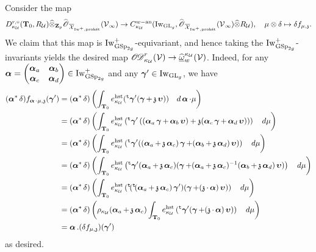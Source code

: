 Consider the map
$$D_{\kappa_{\calU}}^{r, \circ}(\T_0, R_{\calU})\widehat{\otimes}_{\Z_p}\widehat{\scrO}_{\overline{\calX}_{\Iw^+, \proket}}(\calV_{\infty})\rightarrow C^{w-\an}_{\kappa_{\calU}}(\Iw_{\GL_g}, \widehat{\scrO}_{\overline{\calX}_{\Iw^+, \proket}}(\calV_{\infty})\widehat{\otimes}R_{\calU}), \quad \mu\otimes \delta\mapsto \delta f_{\mu, \frakz}.$$
We claim that this map is $\Iw_{\GSp_{2g}}^+$-equivariant, and hence taking the $\Iw_{\GSp_{2g}}^+$-invariants yields the desired map $\sheafOD_{\kappa_{\calU}}^r(\calV)\rightarrow\widehat{\underline{\omega}}_{w}^{\kappa_{\calU}}(\calV)$. Indeed, for any $\bfalpha=\begin{pmatrix}\bfalpha_a & \bfalpha_b\\ \bfalpha_c & \bfalpha_d\end{pmatrix}\in \Iw_{\GSp_{2g}}^+$ and any $\bfgamma'\in \Iw_{\GL_g}$, we have 
\begin{align*}
(\bfalpha^* \delta) f_{\bfalpha\cdot\mu, \frakz}(\bfgamma') & =  (\bfalpha^* \delta)\left(\int_{\T_0} e_{\kappa_{\calU}}^{\hst}(\trans\bfgamma'(\bfgamma+\frakz\bfupsilon))\quad d\bfalpha\cdot \mu\right) \\
    & = (\bfalpha^* \delta)\left(\int_{\T_0}e_{\kappa_{\calU}}^{\hst}\left(\trans\bfgamma'\left((\bfalpha_a\bfgamma+\bfalpha_b\bfupsilon)+\frakz(\bfalpha_c\bfgamma+\bfalpha_d\bfupsilon)\right)\right)\quad d\mu\right)\\
    & = (\bfalpha^* \delta) \left(\int_{\T_0}e_{\kappa_{\calU}}^{\hst}\left(\trans\bfgamma'((\bfalpha_a+\frakz\bfalpha_c)\bfgamma+(\bfalpha_b+\frakz\bfalpha_d)\bfupsilon)\right)\quad d\mu\right)\\
    & = (\bfalpha^* \delta)\left(\int_{\T_0}e_{\kappa_{\calU}}^{\hst}\left(\trans\bfgamma'(\bfalpha_a+\frakz\bfalpha_c)(\bfgamma+(\bfalpha_a+\frakz\bfalpha_c)^{-1}(\bfalpha_b+\frakz\bfalpha_d)\bfupsilon)\right)\quad d\mu\right) \\
    & = (\bfalpha^* \delta)\left(\int_{\T_0}e_{\kappa_{\calU}}^{\hst}\left(\trans(\trans(\bfalpha_a+\frakz\bfalpha_c)\bfgamma')(\bfgamma+(\frakz\cdot \bfalpha)\bfupsilon)\right)\quad d\mu\right) \\
    & = (\bfalpha^* \delta) \left(\rho_{\kappa_{\calU}}(\bfalpha_a+\frakz\bfalpha_c) \int_{\T_0}e_{\kappa_{\calU}}^{\hst}\left(\trans\bfgamma'(\bfgamma+(\frakz\cdot\bfalpha)\bfupsilon)\right)\quad d\mu\right)\\
    &= \bfalpha.(\delta f_{\mu, \frakz})(\bfgamma')
\end{align*}
as desired.

